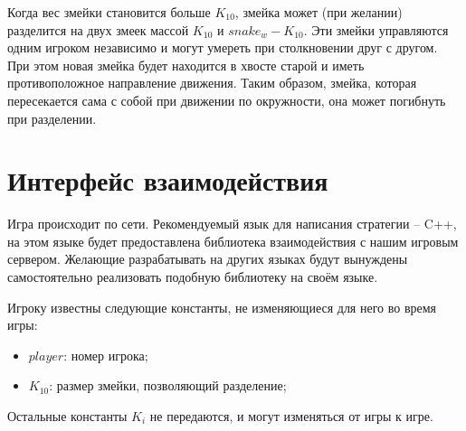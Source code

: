 \documentclass[12pt, a4paper]{article}
\begin{document}
Когда вес змейки становится больше $K_{10}$, змейка может (при желании) разделится на двух змеек массой $K_{10}$ и $snake_w - K_{10}$. Эти змейки управляются одним игроком независимо и могут умереть при столкновении друг с другом. При этом новая змейка будет находится в хвосте старой и иметь противоположное направление движения. Таким образом, змейка, которая пересекается сама с собой при движении по окружности, она может погибнуть при разделении.

{\section{Интерфейс взаимодействия}}

Игра происходит по сети. Рекомендуемый язык для написания стратегии -- C++, на этом языке будет предоставлена библиотека взаимодействия с нашим игровым сервером. Желающие разрабатывать на других языках будут вынуждены самостоятельно реализовать подобную библиотеку на своём языке.

Игроку известны следующие константы, не изменяющиеся для него во время игры:
\begin{itemize}
\item $player$: номер игрока;
\item $K_{10}$: размер змейки, позволяющий разделение;
\end{itemize}

Остальные константы $K_i$ не передаются, и могут изменяться от игры к игре.
\end{document}
